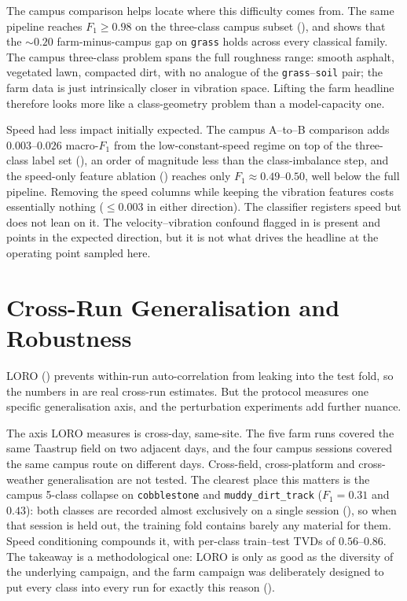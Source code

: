 The campus comparison helps locate where this difficulty comes from. The same pipeline reaches $F_1 \ge 0.98$ on the three-class campus subset (), and  shows that the $\sim 0.20$ farm-minus-campus gap on \texttt{grass} holds across every classical family. The campus three-class problem spans the full roughness range: smooth asphalt, vegetated lawn, compacted dirt, with no analogue of the \texttt{grass}--\texttt{soil} pair; the farm data is just intrinsically closer in vibration space. Lifting the farm headline therefore looks more like a class-geometry problem than a model-capacity one.

Speed had less impact initially expected. The campus A--to--B comparison adds $0.003$--$0.026$ macro-$F_1$ from the low-constant-speed regime on top of the three-class label set (), an order of magnitude less than the class-imbalance step, and the speed-only feature ablation () reaches only $F_1 \approx 0.49$--$0.50$, well below the full pipeline. Removing the speed columns while keeping the vibration features costs essentially nothing ($\le 0.003$ in either direction). The classifier registers speed but does not lean on it. The velocity--vibration confound flagged in  is present and points in the expected direction, but it is not what drives the headline at the operating point sampled here.

\section{Cross-Run Generalisation and Robustness}
\label{sec:disc_generalisation}

LORO () prevents within-run auto-correlation from leaking into the test fold, so the numbers in  are real cross-run estimates. But the protocol measures one specific generalisation axis, and the perturbation experiments add further nuance.

The axis LORO measures is cross-day, same-site. The five farm runs covered the same Taastrup field on two adjacent days, and the four campus sessions covered the same campus route on different days. Cross-field, cross-platform and cross-weather generalisation are not tested. The clearest place this matters is the campus 5-class collapse on \texttt{cobblestone} and \texttt{muddy\_dirt\_track} ($F_1 = 0.31$ and $0.43$): both classes are recorded almost exclusively on a single session (), so when that session is held out, the training fold contains barely any material for them. Speed conditioning compounds it, with per-class train--test TVDs of $0.56$--$0.86$. The takeaway is a methodological one: LORO is only as good as the diversity of the underlying campaign, and the farm campaign was deliberately designed to put every class into every run for exactly this reason ().


